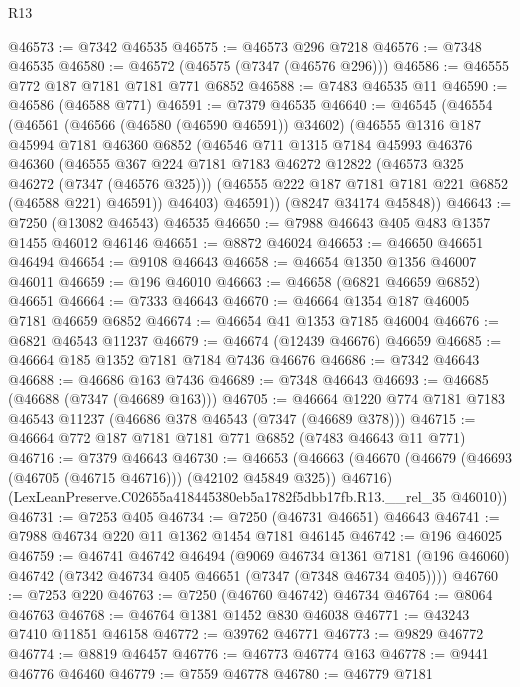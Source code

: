 \begin{lexlean}{R13}
\begin{coremodule}
@46573 := @7342 @46535
@46575 := @46573 @296 @7218
@46576 := @7348 @46535
@46580 := @46572 (@46575 (@7347 (@46576 @296)))
@46586 := @46555 @772 @187 @7181 @7181 @771 @6852
@46588 := @7483 @46535 @11
@46590 := @46586 (@46588 @771)
@46591 := @7379 @46535
@46640 := @46545
    (@46554
      (@46561
        (@46566 (@46580 (@46590 @46591)) @34602)
        (@46555
          @1316
          @187
          @45994
          @7181
          @46360
          @6852
          (@46546
            @711
            @1315
            @7184
            @45993
            @46376
            @46360
            (@46555
              @367
              @224
              @7181
              @7183
              @46272
              @12822
              (@46573 @325 @46272 (@7347 (@46576 @325)))
              (@46555 @222 @187 @7181 @7181 @221 @6852 (@46588 @221) @46591))
            @46403)
          @46591))
      (@8247 @34174 @45848))
@46643 := @7250 (@13082 @46543) @46535
@46650 := @7988 @46643 @405 @483 @1357 @1455 @46012 @46146
@46651 := @8872 @46024
@46653 := @46650 @46651 @46494
@46654 := @9108 @46643
@46658 := @46654 @1350 @1356 @46007 @46011
@46659 := @196 @46010
@46663 := @46658 (@6821 @46659 @6852) @46651
@46664 := @7333 @46643
@46670 := @46664 @1354 @187 @46005 @7181 @46659 @6852
@46674 := @46654 @41 @1353 @7185 @46004
@46676 := @6821 @46543 @11237
@46679 := @46674 (@12439 @46676) @46659
@46685 := @46664 @185 @1352 @7181 @7184 @7436 @46676
@46686 := @7342 @46643
@46688 := @46686 @163 @7436
@46689 := @7348 @46643
@46693 := @46685 (@46688 (@7347 (@46689 @163)))
@46705 := @46664 @1220 @774 @7181 @7183 @46543 @11237 (@46686 @378 @46543 (@7347 (@46689 @378)))
@46715 := @46664 @772 @187 @7181 @7181 @771 @6852 (@7483 @46643 @11 @771)
@46716 := @7379 @46643
@46730 := @46653
    (@46663
      (@46670 (@46679 (@46693 (@46705 (@46715 @46716))) (@42102 @45849 @325)) @46716)
      (LexLeanPreserve.C02655a418445380eb5a1782f5dbb17fb.R13.__rel_35 @46010))
@46731 := @7253 @405
@46734 := @7250 (@46731 @46651) @46643
@46741 := @7988 @46734 @220 @11 @1362 @1454 @7181 @46145
@46742 := @196 @46025
@46759 := @46741
    @46742
    @46494
    (@9069
      @46734
      @1361
      @7181
      (@196 @46060)
      @46742
      (@7342 @46734 @405 @46651 (@7347 (@7348 @46734 @405))))
@46760 := @7253 @220
@46763 := @7250 (@46760 @46742) @46734
@46764 := @8064 @46763
@46768 := @46764 @1381 @1452 @830 @46038
@46771 := @43243 @7410 @11851 @46158
@46772 := @39762 @46771
@46773 := @9829 @46772
@46774 := @8819 @46457
@46776 := @46773 @46774 @163
@46778 := @9441 @46776 @46460
@46779 := @7559 @46778
@46780 := @46779 @7181

\end{coremodule}
\end{lexlean}
